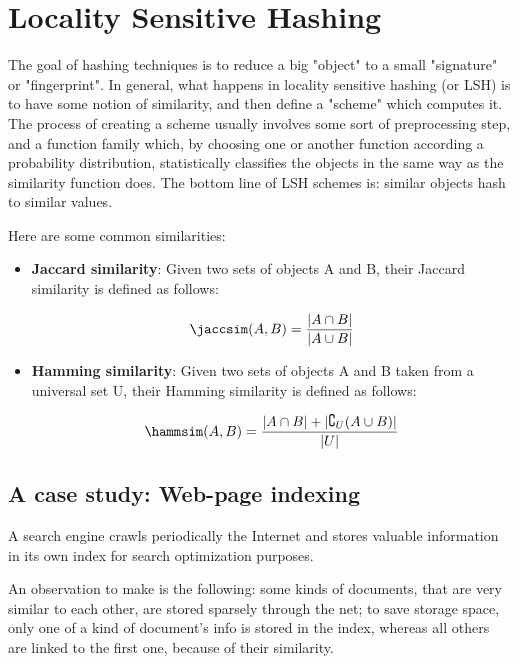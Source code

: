 \chapter{Locality Sensitive Hashing}
	
	The goal of hashing techniques is to reduce a big "object" to a small "signature" or "fingerprint". In general, what happens in locality sensitive hashing (or LSH) is to have some notion of similarity, and then define a "scheme" which computes it. The process of creating a scheme usually involves some sort of preprocessing step, and a function family which, by choosing one or another function according a probability distribution, statistically classifies the objects in the same way as the similarity function does.
	The bottom line of LSH schemes is: similar objects hash to similar values.
	
	Here are some common similarities:
	\begin{itemize}
	
	\item \textbf{Jaccard similarity}: Given two sets of objects A and B, their Jaccard similarity is defined as follows:
	
	\begin{equation}
	\jaccsim(A, B) = \frac{|A\cap B|}{|A\cup B|}
	\end{equation}
	
	\item \textbf{Hamming similarity}: Given two sets of objects A and B taken from a universal set U, their Hamming similarity is defined as follows:
	
	\begin{equation}
	\hammsim(A, B) = \frac{|A\cap B| + |\complement_U(A\cup B)|}{|U|}
	\end{equation}
	
	\end{itemize}
	
\section{A case study: Web-page indexing}
	
	A search engine crawls periodically the Internet and stores valuable information in its own index for search optimization purposes.
	
	An observation to make is the following: some kinds of documents, that are very similar to each other, are stored sparsely through the net; to save storage space, only one of a kind of document's info is stored in the index, whereas all others are linked to the first one, because of their similarity.
	
